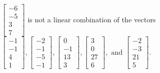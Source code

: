 \begin{exercise}
\begin{exerciseStatement}
  \end{exerciseStatement}
  \begin{exerciseAnswer}
   \(\left[\begin{array}{c}
-6 \\
-5 \\
3 \\
7
\end{array}\right]\) 
  	 is not  
	a linear combination of the vectors \(\left[\begin{array}{c}
-1 \\
-1 \\
4 \\
1
\end{array}\right] , \left[\begin{array}{c}
-2 \\
-1 \\
-5 \\
-1
\end{array}\right] , \left[\begin{array}{c}
0 \\
-1 \\
13 \\
3
\end{array}\right] , \left[\begin{array}{c}
3 \\
0 \\
27 \\
6
\end{array}\right] , \text{ and } \left[\begin{array}{c}
-2 \\
-3 \\
21 \\
5
\end{array}\right]\).

	
  


  \end{exerciseAnswer}
\end{exercise}